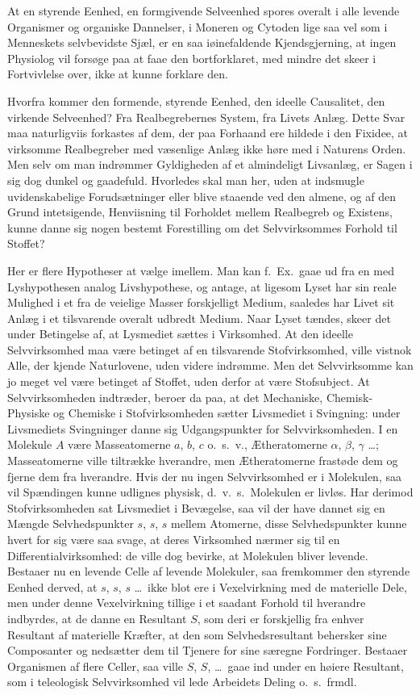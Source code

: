 \documentclass[12pt]{book}
\newcommand{\apage}[1]{\marginnote{\footnotesize\textit{[#1]}}}
\begin{document}
At en styrende Eenhed, en formgivende Selveenhed spores overalt i alle
levende Organismer og organiske Dannelser, i Moneren og Cytoden lige saa
vel som i Menneskets selvbevidste Sjæl, er en saa iøinefaldende
Kjendsgjerning, at ingen Physiolog vil forsøge paa at faae den
bortforklaret, med mindre det skeer i Fortvivlelse over, ikke at kunne
forklare den.

Hvorfra kommer den formende, styrende Eenhed, den ideelle Causalitet, den
virkende Selveenhed? Fra Realbegrebernes System, fra Livets Anlæg. Dette
Svar maa naturligviis forkastes af dem, der paa Forhaand ere hildede i den
Fixidee, at virksomme Realbegreber med væsenlige Anlæg ikke høre med i
Naturens Orden. Men selv om man indrømmer Gyldigheden af et \apage{181} almindeligt
Livsanlæg, er Sagen i sig dog dunkel og gaadefuld. Hvorledes skal man her,
uden at indsmugle uvidenskabelige Forudsætninger eller blive staaende ved
den almene, og af den Grund intetsigende, Henviisning til Forholdet mellem
Realbegreb og Existens, kunne danne sig nogen bestemt Forestilling om det
Selvvirksommes Forhold til Stoffet?

Her er flere Hypotheser at vælge imellem. Man kan f.\ Ex.\ gaae ud fra en
med Lyshypothesen analog Livshypothese, og antage, at ligesom Lyset har sin
reale Mulighed i et fra de veielige Masser forskjelligt Medium, saaledes
har Livet sit Anlæg i et tilsvarende overalt udbredt Medium. Naar Lyset
tændes, skeer det under Betingelse af, at Lysmediet sættes i Virksomhed. At
den ideelle Selvvirksomhed maa være betinget af en tilsvarende
Stofvirksomhed, ville vistnok Alle, der kjende Naturlovene, uden videre
indrømme. Men det Selvvirksomme kan jo meget vel være betinget af Stoffet,
uden derfor at være Stofsubject. At Selvvirksomheden indtræder, beroer da
paa, at det Mechaniske, Chemisk-Physiske og Chemiske i Stofvirksomheden
sætter Livsmediet i Svingning: under Livsmediets Svingninger danne sig
Udgangspunkter for Selvvirksomheden. I en Molekule $A$ være Masseatomerne
$a$, $b$, $c$ o.\ s.\ v., Ætheratomerne $\alpha$, $\beta$, $\gamma$ \ldots;
Masseatomerne ville tiltrække hverandre, men Ætheratomerne frastøde dem og
fjerne dem fra hverandre. Hvis der nu ingen Selvvirksomhed er i Molekulen,
saa vil Spændingen kunne udlignes physisk, d.\ v.\ s.\ Molekulen er livløs. Har
derimod Stofvirksomheden sat \apage{182} Livsmediet i Bevægelse, saa vil der have
dannet sig en Mængde Selvhedspunkter $s$, $s$, $s$ mellem Atomerne, disse
Selvhedspunkter kunne hvert for sig være saa svage, at deres Virksomhed
nærmer sig til en Differentialvirksomhed: de ville dog bevirke, at
Molekulen bliver levende. Bestaaer nu en levende Celle af levende
Molekuler, saa fremkommer den styrende Eenhed derved, at $s$, $s$, $s$ \ldots\ ikke
blot ere i Vexelvirkning med de materielle Dele, men under denne
Vexelvirkning tillige i et saadant Forhold til hverandre indbyrdes, at de
danne en Resultant $S$, som deri er forskjellig fra enhver Resultant af
materielle Kræfter, at den som Selvhedsresultant behersker sine Composanter
og nedsætter dem til Tjenere for sine særegne Fordringer. Bestaaer
Organismen af flere Celler, saa ville $S$, $S$, \ldots\ gaae ind under en høiere
Resultant, som i teleologisk Selvvirksomhed vil lede Arbeidets Deling
o.\ s.\ frmdl.
\end{document}
